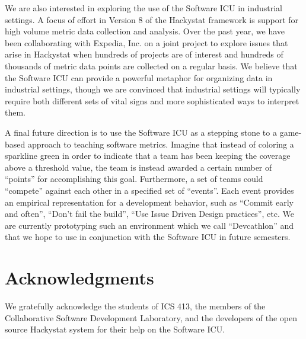\documentclass{acm_proc_article-sp}
\begin{document}
We are also interested in exploring the use of the Software ICU in
industrial settings.  A focus of effort in Version 8 of the Hackystat
framework is support for high volume metric data collection and
analysis.  Over the past year, we have been collaborating with Expedia,
Inc. on a joint project to explore issues that arise in Hackystat when
hundreds of projects are of interest and hundreds of thousands of metric
data points are collected on a regular basis.  We believe that the Software
ICU can provide a powerful metaphor for organizing data in industrial
settings, though we are convinced that industrial settings will typically
require both different sets of vital signs and more sophisticated ways to
interpret them.

A final future direction is to use the Software ICU as a stepping stone to
a game-based approach to teaching software metrics.  Imagine that instead
of coloring a sparkline green in order to indicate that a team has been
keeping the coverage above a threshold value, the team is instead awarded
a certain number of ``points'' for accomplishing this goal.  Furthermore,
a set of teams could ``compete'' against each other in a specified set of
``events''.  Each event provides an empirical representation for a
development behavior, such as ``Commit early and often'', ``Don't fail the
build'', ``Use Issue Driven Design practices'', etc.  We are currently
prototyping such an environment which we call ``Devcathlon'' and that we
hope to use in conjunction with the Software ICU in future semesters.

\section{Acknowledgments}

We gratefully acknowledge the students of ICS 413, the members of the Collaborative Software Development Laboratory, and
the developers of the open source Hackystat system for their help on the Software ICU.


  
\end{document}

